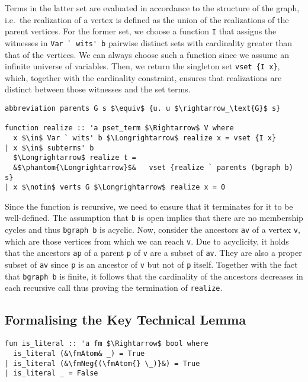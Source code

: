 \documentclass[sigplan,10pt,anonymous,review]{acmart}
\newcommand{\fmNegSymbol}{\boldsymbol{\neg}}
\newcommand{\fmNeg}[1]{$\fmNegSymbol$ #1}
\newcommand{\fmAtom}{\textbf{A}}
\begin{document}
Terms in the latter set are evaluated in accordance to the structure of the graph, i.e.\ the realization of a vertex is defined as the union of the realizations of the parent vertices. 
For the former set, we choose a function \lstinline!I! that assigns the witnesses in \lstinline!Var ` wits' b! pairwise distinct sets with cardinality greater than that of the vertices.
We can always choose such a function since we assume an infinite universe of variables.
Then, we return the singleton set \lstinline!vset {I x}!, which, together with the cardinality constraint, ensures that realizations are distinct between those witnesses and the set terms.  
\begin{lstlisting}
abbreviation parents G s $\equiv$ {u. u $\rightarrow_\text{G}$ s}

function realize :: 'a pset_term $\Rightarrow$ V where
  x $\in$ Var ` wits' b $\Longrightarrow$ realize x = vset {I x}
| x $\in$ subterms' b
  $\Longrightarrow$ realize t =
  &$\phantom{\Longrightarrow}$&   vset {realize ` parents (bgraph b) s}
| x $\notin$ verts G $\Longrightarrow$ realize x = 0
\end{lstlisting}
Since the function is recursive, we need to ensure that it terminates for it to be well-defined.
The assumption that \lstinline!b! is open implies that there are no membership cycles and thus \lstinline!bgraph b! is acyclic.
Now, consider the ancestors \lstinline!av! of a vertex \lstinline!v!, which are those vertices from which we can reach \lstinline!v!.
Due to acyclicity, it holds that the ancestors \lstinline!ap! of a parent \lstinline!p! of \lstinline!v! are a subset of \lstinline!av!.
They are also a proper subset of \lstinline!av! since \lstinline!p! is an ancestor of \lstinline!v! but not of \lstinline!p! itself.
Together with the fact that \lstinline!bgraph b! is finite, it follows that the cardinality of the ancestors decreases in each recursive call thus proving the termination of \lstinline!realize!.

\subsection{Formalising the Key Technical Lemma}
\begin{lstlisting}
fun is_literal :: 'a fm $\Rightarrow$ bool where
  is_literal (&\fmAtom& _) = True
| is_literal (&\fmNeg{(\fmAtom{} \_)}&) = True
| is_literal _ = False
\end{lstlisting}
\end{document}
